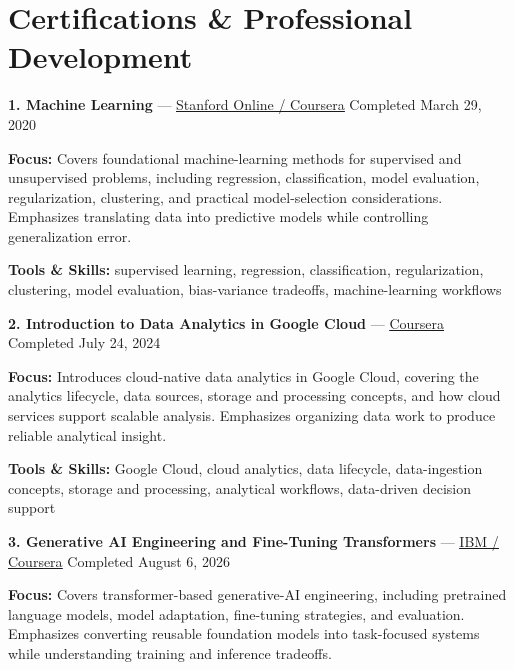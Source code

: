 \documentclass[9pt,letterpaper]{extarticle}
\begin{document}
\section{Certifications \& Professional Development}
\noindent\textbf{1. Machine Learning} {\small --- \textcolor{blue}{\underline{\href{https://www.coursera.org/account/accomplishments/verify/VU3Y5TBLVLZT}{Stanford Online / Coursera}}} \textbar{} Completed \textbar{} March 29, 2020}\par
\textbf{Focus:} Covers foundational machine-learning methods for supervised and unsupervised problems, including regression, classification, model evaluation, regularization, clustering, and practical model-selection considerations. Emphasizes translating data into predictive models while controlling generalization error.\par
{\small\textbf{Tools \& Skills:} supervised learning, regression, classification, regularization, clustering, model evaluation, bias-variance tradeoffs, machine-learning workflows\par}
\vspace{2pt}
\noindent\textbf{2. Introduction to Data Analytics in Google Cloud} {\small --- \textcolor{blue}{\underline{\href{https://www.coursera.org/account/accomplishments/verify/R9FGPRZ3NJE8}{Coursera}}} \textbar{} Completed \textbar{} July 24, 2024}\par
\textbf{Focus:} Introduces cloud-native data analytics in Google Cloud, covering the analytics lifecycle, data sources, storage and processing concepts, and how cloud services support scalable analysis. Emphasizes organizing data work to produce reliable analytical insight.\par
{\small\textbf{Tools \& Skills:} Google Cloud, cloud analytics, data lifecycle, data-ingestion concepts, storage and processing, analytical workflows, data-driven decision support\par}
\vspace{2pt}
\noindent\textbf{3. Generative AI Engineering and Fine-Tuning Transformers} {\small --- \textcolor{blue}{\underline{\href{https://www.coursera.org/account/accomplishments/verify/SG4GDJ4CLPVL}{IBM / Coursera}}} \textbar{} Completed \textbar{} August 6, 2026}\par
\textbf{Focus:} Covers transformer-based generative-AI engineering, including pretrained language models, model adaptation, fine-tuning strategies, and evaluation. Emphasizes converting reusable foundation models into task-focused systems while understanding training and inference tradeoffs.\par
\end{document}
